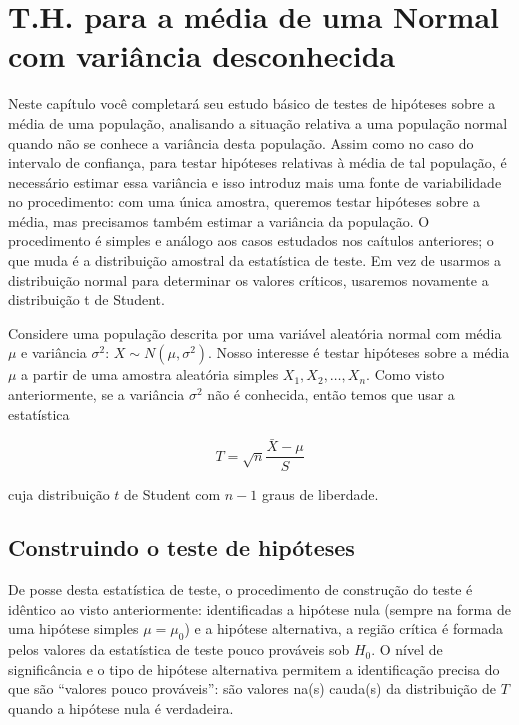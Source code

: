 \documentclass[
]{book}
\begin{document}
\hypertarget{t.h.-para-a-muxe9dia-de-uma-normal-com-variuxe2ncia-desconhecida}{%
\section{T.H. para a média de uma Normal com variância desconhecida}\label{t.h.-para-a-muxe9dia-de-uma-normal-com-variuxe2ncia-desconhecida}}

Neste capítulo você completará seu estudo básico de testes de hipóteses sobre a média de uma população, analisando a situação relativa a uma população normal quando não se conhece a variância desta população. Assim como no caso do intervalo de confiança, para testar hipóteses relativas à média de tal população, é necessário estimar essa variância e isso introduz mais uma fonte de variabilidade no procedimento: com uma única amostra, queremos testar hipóteses sobre a média, mas precisamos também estimar a variância da população. O procedimento é simples e análogo aos casos estudados nos caítulos anteriores; o que muda é a distribuição amostral da estatística de teste. Em vez de usarmos a distribuição normal para determinar os valores críticos, usaremos novamente a distribuição t de Student.

Considere uma população descrita por uma variável aleatória normal com média \(\mu\) e variância \(\sigma^2\): \(X\sim N(\mu,\sigma^2)\). Nosso interesse é testar hipóteses sobre a média \(\mu\) a partir de uma amostra aleatória simples \(X_1, X_2, \ldots, X_n\). Como visto anteriormente, se a variância \(\sigma^2\) não é conhecida, então temos que usar a estatística

\[T=\sqrt{n}\frac{\bar X-\mu}{S}\]

cuja distribuição \(t\) de Student com \(n-1\) graus de liberdade.

\hypertarget{construindo-o-teste-de-hipuxf3teses-1}{%
\subsection{Construindo o teste de hipóteses}\label{construindo-o-teste-de-hipuxf3teses-1}}

De posse desta estatística de teste, o procedimento de construção do teste é idêntico ao visto anteriormente: identificadas a hipótese nula (sempre na forma de uma hipótese simples \(\mu=\mu_0\)) e a hipótese alternativa, a região crítica é formada pelos valores da estatística de teste pouco prováveis sob \(H_0\). O nível de significância e o tipo de hipótese alternativa permitem a identificação precisa do que são ``valores pouco prováveis'': são valores na(s) cauda(s) da distribuição de \(T\) quando a hipótese nula é verdadeira.
\end{document}
